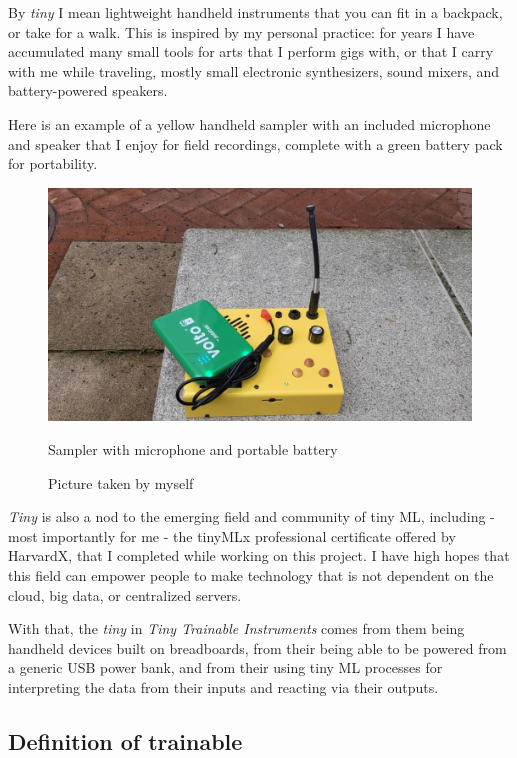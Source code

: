 By \emph{tiny} I mean lightweight handheld instruments that you can fit in a  backpack, or take for a walk. This is inspired by my personal practice: for years I have accumulated many small tools for arts that I perform gigs with, or that I carry with me while traveling, mostly small electronic synthesizers, sound mixers, and battery-powered speakers.

Here is an example of a yellow handheld sampler with an included microphone and speaker that I enjoy for field recordings, complete with a green battery pack for portability.

\begin{figure}[ht]
  \centering
  \includegraphics[width=0.75\linewidth,height=0.25\textheight,keepaspectratio]{images/critter-and-guitari-kaleidoloop-battery.jpg}
  \caption{Sampler with microphone and portable battery}
  \caption*{Picture taken by myself}
  \label{fig:critter-and-guitari-kaleidoloop-battery}
\end{figure}

\emph{Tiny} is also a nod to the emerging field and community of tiny \acrshort{ML}, including - most importantly for me - the tinyMLx professional certificate\cite{website-edx-harvardx-tinymlx-professional-certificate} offered by HarvardX, that I completed while working on this project. I have high hopes that this field can empower people to make technology that is not dependent on the cloud, big data, or centralized servers.

With that, the \emph{tiny} in \emph{Tiny Trainable Instruments} comes from them being handheld devices built on breadboards, from their being able to be powered from a generic USB power bank, and from their using tiny \acrshort{ML} processes for interpreting the data from their inputs and reacting via their outputs.

\subsection{Definition of trainable}

